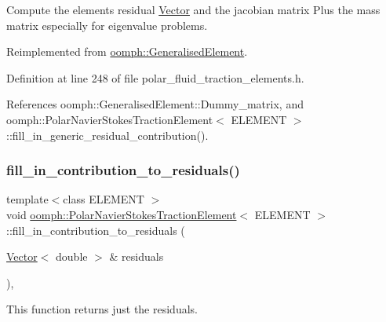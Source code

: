 Compute the element\textquotesingle{}s residual \hyperlink{classoomph_1_1Vector}{Vector} and the jacobian matrix Plus the mass matrix especially for eigenvalue problems. 



Reimplemented from \hyperlink{classoomph_1_1GeneralisedElement_a2b6294a730647cf865da94f2531466f8}{oomph\+::\+Generalised\+Element}.



Definition at line 248 of file polar\+\_\+fluid\+\_\+traction\+\_\+elements.\+h.



References oomph\+::\+Generalised\+Element\+::\+Dummy\+\_\+matrix, and oomph\+::\+Polar\+Navier\+Stokes\+Traction\+Element$<$ E\+L\+E\+M\+E\+N\+T $>$\+::fill\+\_\+in\+\_\+generic\+\_\+residual\+\_\+contribution().

\mbox{\label{classoomph_1_1PolarNavierStokesTractionElement_adedf328068563b40bf9b2a0cafcfe087}} 
\subsubsection{\texorpdfstring{fill\+\_\+in\+\_\+contribution\+\_\+to\+\_\+residuals()}{fill\_in\_contribution\_to\_residuals()}}
{\footnotesize\ttfamily template$<$class E\+L\+E\+M\+E\+NT $>$ \\
void \hyperlink{classoomph_1_1PolarNavierStokesTractionElement}{oomph\+::\+Polar\+Navier\+Stokes\+Traction\+Element}$<$ E\+L\+E\+M\+E\+NT $>$\+::fill\+\_\+in\+\_\+contribution\+\_\+to\+\_\+residuals (\begin{DoxyParamCaption}\item[{\hyperlink{classoomph_1_1Vector}{Vector}$<$ double $>$ \&}]{residuals }\end{DoxyParamCaption})\hspace{0.3cm}{\ttfamily [inline]}, {\ttfamily [virtual]}}



This function returns just the residuals. 



